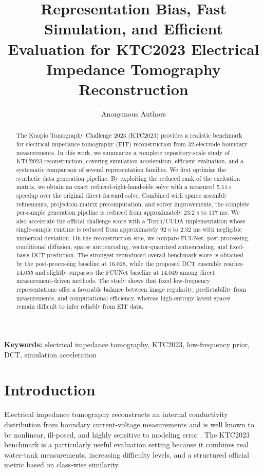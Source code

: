 \documentclass[11pt,a4paper]{article}
\title{Representation Bias, Fast Simulation, and Efficient Evaluation for KTC2023 Electrical Impedance Tomography Reconstruction}
\author{Anonymous Authors}
\date{}
\begin{document}
\maketitle

\begin{abstract}
The Kuopio Tomography Challenge 2023 (KTC2023) provides a realistic benchmark for electrical impedance tomography (EIT) reconstruction from 32-electrode boundary measurements. In this work, we summarize a complete repository-scale study of KTC2023 reconstruction, covering simulation acceleration, efficient evaluation, and a systematic comparison of several representation families. We first optimize the synthetic data generation pipeline. By exploiting the reduced rank of the excitation matrix, we obtain an exact reduced-right-hand-side solve with a measured 5.11$\times$ speedup over the original direct forward solve. Combined with sparse assembly refinements, projection-matrix precomputation, and solver improvements, the complete per-sample generation pipeline is reduced from approximately 23.2 s to 117 ms. We also accelerate the official challenge score with a Torch/CUDA implementation whose single-sample runtime is reduced from approximately 92 s to 2.32 ms with negligible numerical deviation. On the reconstruction side, we compare FCUNet, post-processing, conditional diffusion, sparse autoencoding, vector-quantized autoencoding, and fixed-basis DCT prediction. The strongest reproduced overall benchmark score is obtained by the post-processing baseline at 16.028, while the proposed DCT ensemble reaches 14.055 and slightly surpasses the FCUNet baseline at 14.049 among direct measurement-driven methods. The study shows that fixed low-frequency representations offer a favorable balance between image regularity, predictability from measurements, and computational efficiency, whereas high-entropy latent spaces remain difficult to infer reliably from EIT data.
\end{abstract}

\noindent\textbf{Keywords:} electrical impedance tomography, KTC2023, low-frequency prior, DCT, simulation acceleration

\section{Introduction}
Electrical impedance tomography reconstructs an internal conductivity distribution from boundary current-voltage measurements and is well known to be nonlinear, ill-posed, and highly sensitive to modeling error \cite{cheney1999eit}. The KTC2023 benchmark \cite{rasanen2023kuopio} is a particularly useful evaluation setting because it combines real water-tank measurements, increasing difficulty levels, and a structured official metric based on class-wise similarity.
\end{document}
